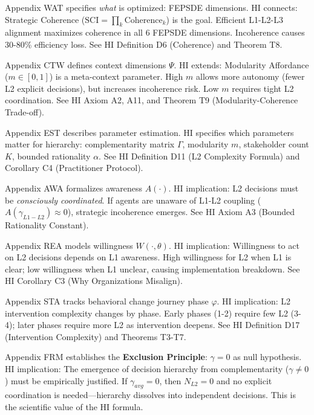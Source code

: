 \begin{tcolorbox}[colback=white, colframe=black,
    title=\textbf{10C Integration: How HI CORE-HIERARCHY Connects to Other COREs}]
\begin{description}[style=nextline, labelindent=0pt, leftmargin=1.5cm]
\item[\textbf{C (CORE-WHAT)}]
Appendix WAT specifies \textit{what} is optimized: FEPSDE dimensions. HI connects: Strategic Coherence ($\text{SCI} = \prod_k \text{Coherence}_k$) is the goal. Efficient L1-L2-L3 alignment maximizes coherence in all 6 FEPSDE dimensions. Incoherence causes 30-80\% efficiency loss. See HI Definition D6 (Coherence) and Theorem T8.

\item[\textbf{V (CORE-WHEN)}]
Appendix CTW defines context dimensions $\Psi$. HI extends: Modularity Affordance ($m \in [0,1]$) is a meta-context parameter. High $m$ allows more autonomy (fewer L2 explicit decisions), but increases incoherence risk. Low $m$ requires tight L2 coordination. See HI Axiom A2, A11, and Theorem T9 (Modularity-Coherence Trade-off).

\item[\textbf{BBB (CORE-WHERE)}]
Appendix EST describes parameter estimation. HI specifies which parameters matter for hierarchy: complementarity matrix $\Gamma$, modularity $m$, stakeholder count $K$, bounded rationality $\alpha$. See HI Definition D11 (L2 Complexity Formula) and Corollary C4 (Practitioner Protocol).

\item[\textbf{AU (CORE-AWARE)}]
Appendix AWA formalizes awareness $A(\cdot)$. HI implication: L2 decisions must be \textit{consciously coordinated}. If agents are unaware of L1-L2 coupling ($A(\gamma_{L1-L2}) \approx 0$), strategic incoherence emerges. See HI Axiom A3 (Bounded Rationality Constant).

\item[\textbf{AV (CORE-READY)}]
Appendix REA models willingness $W(\cdot, \theta)$. HI implication: Willingness to act on L2 decisions depends on L1 awareness. High willingness for L2 when L1 is clear; low willingness when L1 unclear, causing implementation breakdown. See HI Corollary C3 (Why Organizations Misalign).

\item[\textbf{AW (CORE-STAGE)}]
Appendix STA tracks behavioral change journey phase $\varphi$. HI implication: L2 intervention complexity changes by phase. Early phases (1-2) require few L2 (3-4); later phases require more L2 as intervention deepens. See HI Definition D17 (Intervention Complexity) and Theorems T3-T7.

\item[\textbf{XVIII (LIT-FEHR-METHOD)}]
Appendix FRM establishes the \textbf{Exclusion Principle}: $\gamma = 0$ as null hypothesis. HI implication: The emergence of decision hierarchy from complementarity ($\gamma \neq 0$) must be empirically justified. If $\gamma_{avg} = 0$, then $N_{L2} = 0$ and no explicit coordination is needed---hierarchy dissolves into independent decisions. This is the scientific value of the HI formula.


\end{description}
\end{tcolorbox}
